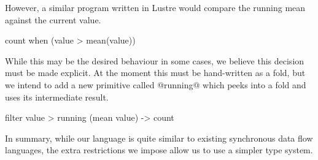 However, a similar program written in {\sc Lustre} would compare the running mean against the current value.
\begin{code}
count when (value > mean(value))
\end{code}

While this may be the desired behaviour in some cases, we believe this decision must be made explicit.
At the moment this must be hand-written as a fold, but we intend to add a new primitive called @running@ which peeks into a fold and uses its intermediate result.
\begin{code}
   filter value > running (mean value)
-> count
\end{code}

In summary, while our language is quite similar to existing synchronous data flow languages, the extra restrictions we impose allow us to use a simpler type system.


